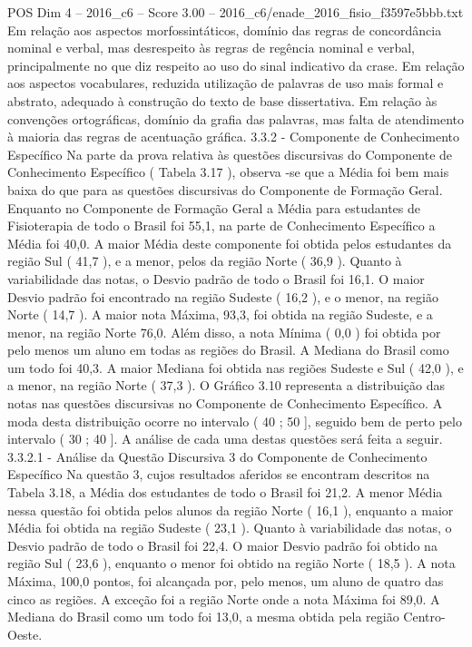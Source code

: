 \begin{textsample}{POS Dim 4 – 2016\_c6 – Score 3.00 – 2016\_c6/enade\_2016\_fisio\_f3597e5bbb.txt}
Em relação aos aspectos morfossintáticos, domínio das regras de concordância nominal e verbal, mas desrespeito às regras de regência nominal e verbal, principalmente no que diz respeito ao uso do sinal indicativo da crase.
Em relação aos aspectos vocabulares, reduzida utilização de palavras de uso mais formal e abstrato, adequado à construção do texto de base dissertativa.
Em relação às convenções ortográficas, domínio da grafia das palavras, mas falta de atendimento à maioria das regras de acentuação gráfica. 3.3.2 - Componente de Conhecimento Específico Na parte da prova relativa às questões discursivas do Componente de Conhecimento Específico ( Tabela 3.17 ), observa -se que a Média foi bem mais baixa do que para as questões discursivas do Componente de Formação Geral.
Enquanto no Componente de Formação Geral a Média para estudantes de Fisioterapia de todo o Brasil foi 55,1, na parte de Conhecimento Específico a Média foi 40,0.
A maior Média deste componente foi obtida pelos estudantes da região Sul ( 41,7 ), e a menor, pelos da região Norte ( 36,9 ).
Quanto à variabilidade das notas, o Desvio padrão de todo o Brasil foi 16,1.
O maior Desvio padrão foi encontrado na região Sudeste ( 16,2 ), e o menor, na região Norte ( 14,7 ).
A maior nota Máxima, 93,3, foi obtida na região Sudeste, e a menor, na região Norte 76,0.
Além disso, a nota Mínima ( 0,0 ) foi obtida por pelo menos um aluno em todas as regiões do Brasil.
A Mediana do Brasil como um todo foi 40,3.
A maior Mediana foi obtida nas regiões Sudeste e Sul ( 42,0 ), e a menor, na região Norte ( 37,3 ).
O Gráfico 3.10 representa a distribuição das notas nas questões discursivas no Componente de Conhecimento Específico.
A moda desta distribuição ocorre no intervalo ( 40 ; 50 ], seguido bem de perto pelo intervalo ( 30 ; 40 ].
A análise de cada uma destas questões será feita a seguir. 3.3.2.1 - Análise da Questão Discursiva 3 do Componente de Conhecimento Específico Na questão 3, cujos resultados aferidos se encontram descritos na Tabela 3.18, a Média dos estudantes de todo o Brasil foi 21,2.
A menor Média nessa questão foi obtida pelos alunos da região Norte ( 16,1 ), enquanto a maior Média foi obtida na região Sudeste ( 23,1 ).
Quanto à variabilidade das notas, o Desvio padrão de todo o Brasil foi 22,4.
O maior Desvio padrão foi obtido na região Sul ( 23,6 ), enquanto o menor foi obtido na região Norte ( 18,5 ).
A nota Máxima, 100,0 pontos, foi alcançada por, pelo menos, um aluno de quatro das cinco as regiões.
A exceção foi a região Norte onde a nota Máxima foi 89,0.
A Mediana do Brasil como um todo foi 13,0, a mesma obtida pela região Centro-Oeste.

\end{textsample}
